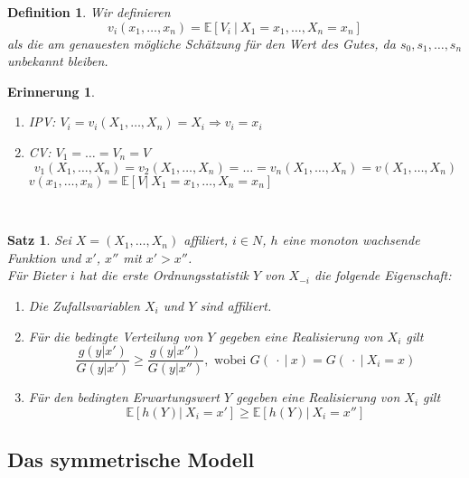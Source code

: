 \documentclass[12pt]{extreport} %
\theoremstyle{named}
\theoremstyle{nnamed}
\theoremstyle{itshape}
\newtheorem{satz}[unnamedtheorem]{Satz}
\newtheorem*{definition}{Definition}
\theoremstyle{normal}
\newtheorem*{erinnerung}{Erinnerung}
\begin{document}
\begin{definition}
	Wir definieren 
	$$ v_{i}(x_1, \dotsc, x_{n}) = \mathbb{E}\left[ V_{i} ~\big|~ X_1 = x_1, \dotsc, X_n = x_n \right]$$
	als die am genauesten mögliche Schätzung für den Wert des Gutes, da $s_{0}, s_{1}, \dotsc, s_{n}$ unbekannt bleiben.
\end{definition}

\begin{erinnerung} ~\
	\begin{enumerate}
		\item IPV: $V_{i} = v_{i}(X_1, \dotsc, X_{n}) = X_{i} \Rightarrow v_i = x_i$
		\item CV: $V_1 = \dotsc = V_n = V$
			$$v_1(X_1, \dotsc, X_n) = v_2(X_1, \dotsc, X_n) = \dotsc = v_n(X_1, \dotsc, X_n) = v(X_1, \dotsc, X_n)$$
			$v(x_1, \dotsc, x_n) = \mathbb{E}\left[ V |~X_1 = x_1, \dotsc, X_n = x_n \right]$
	\end{enumerate}		
\end{erinnerung}
~\newline
\begin{satz}
	Sei $X = (X_1, \dotsc, X_n)$ affiliert, $i \in N$, $h$ eine monoton wachsende Funktion und $x'$, $x''$ mit $x' > x''$. ~\\
	
	Für Bieter $i$ hat die erste Ordnungsstatistik $Y$ von $X_{-i}$ die folgende Eigenschaft:
	\begin{enumerate}
		\item Die Zufallsvariablen $X_{i}$ und $Y$ sind affiliert.
		\item Für die bedingte Verteilung von $Y$ gegeben eine Realisierung von $X_i$ gilt
			$$ \frac{g(y|x')}{G(y|x')} \geq \frac{g(y|x'')}{G(y|x'')}, \text{ wobei } G(~\cdot ~ | ~ x) = G(~\cdot ~ | ~ X_{i} = x) $$
		\item Für den bedingten Erwartungswert $Y$ gegeben eine Realisierung von $X_i$ gilt
			$$  \mathbb{E}\left[ h(Y) \big| ~ X_{i} = x' \right] \geq \mathbb{E}\left[ h(Y) \big| ~ X_{i} = x'' \right] $$
	\end{enumerate}
\end{satz}

\subsection{Das symmetrische Modell}
\end{document}

